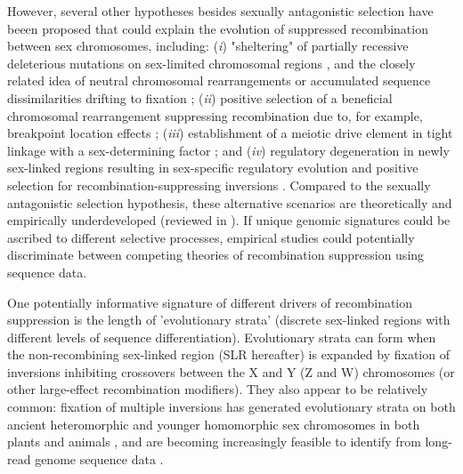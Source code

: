 \documentclass{article}[12pt]
\begin{document}
However, several other hypotheses besides sexually antagonistic selection have beeen proposed that could explain the evolution of suppressed recombination between sex chromosomes, including: ({\itshape i}) "sheltering" of partially recessive deleterious mutations on sex-limited chromosomal regions \citep{Ironside2010, Ponnikas2018, Olito-etal-2022, Jay2022}, and the closely related idea of neutral chromosomal rearrangements or accumulated sequence dissimilarities drifting to fixation \citep{CharlesworthMarais2005}; ({\itshape ii}) positive selection of a beneficial chromosomal rearrangement suppressing recombination \citep{Haldane1957} due to, for example, breakpoint location effects \citep{CorbettDetig2016}; ({\itshape iii}) establishment of a meiotic drive element in tight linkage with a sex-determining factor \citep{UbedaPatten2010}; and ({\itshape iv}) regulatory degeneration in newly sex-linked regions resulting in sex-specific regulatory evolution and positive selection for recombination-suppressing inversions \citep{LenormandRoze2022}. Compared to the sexually antagonistic selection hypothesis, these alternative scenarios are theoretically and empirically underdeveloped (reviewed in \citealt{Ironside2010, Ponnikas2018,Olito-etal-2022}). If unique genomic signatures could be ascribed to different selective processes, empirical studies could potentially discriminate between competing theories of recombination suppression using sequence data. 

One potentially informative signature of different drivers of recombination suppression is the length of 'evolutionary strata' (discrete sex-linked regions with different levels of sequence differentiation). Evolutionary strata can form when the non-recombining sex-linked region (SLR hereafter) is expanded by fixation of inversions inhibiting crossovers between the X and Y (Z and W) chromosomes (or other large-effect recombination modifiers). They also appear to be relatively common: fixation of multiple inversions has generated evolutionary strata on both ancient heteromorphic and younger homomorphic sex chromosomes in both plants and animals \citep{LahnPage1999,Handley2004, Wang2012}, and are becoming increasingly feasible to identify from long-read genome sequence data \citep{WellenreutherBernatchez2018}. 
\end{document}
